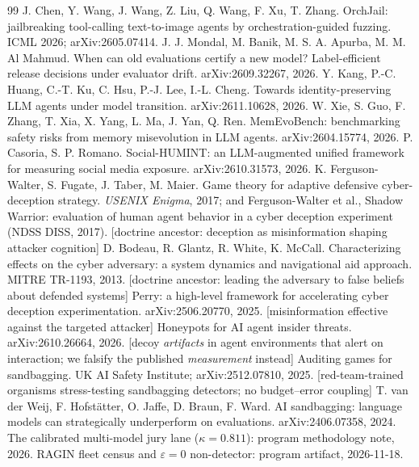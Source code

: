 \documentclass[acmsmall,review,anonymous]{acmart}
\begin{document}
\begin{thebibliography}{99}
 J. Chen, Y. Wang, J. Wang, Z. Liu, Q. Wang, F. Xu, T. Zhang. OrchJail: jailbreaking tool-calling text-to-image agents by orchestration-guided fuzzing. ICML 2026; arXiv:2605.07414.
 J. J. Mondal, M. Banik, M. S. A. Apurba, M. M. Al Mahmud. When can old evaluations certify a new model? Label-efficient release decisions under evaluator drift. arXiv:2609.32267, 2026.
 Y. Kang, P.-C. Huang, C.-T. Ku, C. Hsu, P.-J. Lee, I.-L. Cheng. Towards identity-preserving LLM agents under model transition. arXiv:2611.10628, 2026.
 W. Xie, S. Guo, F. Zhang, T. Xia, X. Yang, L. Ma, J. Yan, Q. Ren. MemEvoBench: benchmarking safety risks from memory misevolution in LLM agents. arXiv:2604.15774, 2026.
 P. Casoria, S. P. Romano. Social-HUMINT: an LLM-augmented unified framework for measuring social media exposure. arXiv:2610.31573, 2026.
 K. Ferguson-Walter, S. Fugate, J. Taber, M. Maier. Game theory for adaptive defensive cyber-deception strategy. \emph{USENIX Enigma}, 2017; and Ferguson-Walter et al., Shadow Warrior: evaluation of human agent behavior in a cyber deception experiment (NDSS DISS, 2017). [doctrine ancestor: deception as misinformation shaping attacker cognition]
 D. Bodeau, R. Glantz, R. White, K. McCall. Characterizing effects on the cyber adversary: a system dynamics and navigational aid approach. MITRE TR-1193, 2013. [doctrine ancestor: leading the adversary to false beliefs about defended systems]
 Perry: a high-level framework for accelerating cyber deception experimentation. arXiv:2506.20770, 2025. [misinformation effective against the targeted attacker]
 Honeypots for AI agent insider threats. arXiv:2610.26664, 2026. [decoy \emph{artifacts} in agent environments that alert on interaction; we falsify the published \emph{measurement} instead]
 Auditing games for sandbagging. UK AI Safety Institute; arXiv:2512.07810, 2025. [red-team-trained organisms stress-testing sandbagging detectors; no budget--error coupling]
 T. van der Weij, F. Hofst\"atter, O. Jaffe, D. Braun, F. Ward. AI sandbagging: language models can strategically underperform on evaluations. arXiv:2406.07358, 2024.
 The calibrated multi-model jury lane ($\kappa=0.811$): program methodology note, 2026.
 RAGIN fleet census and $\varepsilon=0$ non-detector: program artifact, 2026-11-18.
\end{thebibliography}
\end{document}
